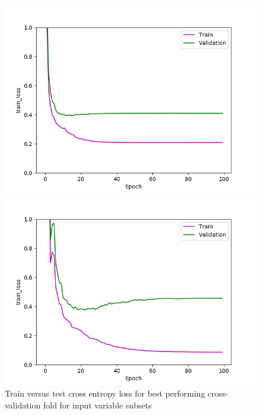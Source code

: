 \def\year{2017}\relax \documentclass[letterpaper]{article}
\begin{document}
\begin{figure}
\begin{minipage}{.24\textwidth}
  \centering
\includegraphics[width=\textwidth]{pics/d3_train_loss_best_train_test.png}
\caption{$D_3$}\label{fig:d3losstraintest}
\end{minipage}
\begin{minipage}{.01\textwidth}
\end{minipage}
\begin{minipage}{.24\textwidth}
  \centering
\includegraphics[width=\textwidth]{pics/d4_train_loss_best_train_test.png}
\caption{$D_4$}\label{fig:d4losstraintest}
\end{minipage}
\caption{Train versus test cross entropy loss for best performing cross-validation fold for input variable subsets}\label{fig:traintesloss}
\end{figure}
\end{document}
